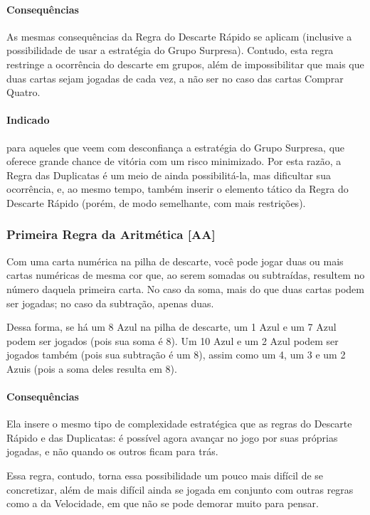 \paragraph{Consequências}

As mesmas consequências da Regra do Descarte Rápido se aplicam (inclusive a possibilidade de usar a estratégia do Grupo Surpresa). Contudo, esta regra restringe a ocorrência do descarte em grupos, além de impossibilitar que mais que duas cartas sejam jogadas de cada vez, a não ser no caso das cartas Comprar Quatro.

\paragraph{Indicado} 

para aqueles que veem com desconfiança a estratégia do Grupo Surpresa, que oferece grande chance de vitória com um risco minimizado. Por esta razão, a Regra das Duplicatas é um meio de ainda possibilitá-la, mas dificultar sua ocorrência, e, ao mesmo tempo, também inserir o elemento tático da Regra do Descarte Rápido (porém, de modo semelhante, com mais restrições).

\subsubsection{Primeira Regra da Aritmética [AA]}

Com uma carta numérica na pilha de descarte, você pode jogar duas ou mais cartas numéricas de mesma cor que, ao serem somadas ou subtraídas, resultem no número daquela primeira carta. No caso da soma, mais do que duas cartas podem ser jogadas; no caso da subtração, apenas duas.

Dessa forma, se há um 8 Azul na pilha de descarte, um 1 Azul e um 7 Azul podem ser jogados (pois sua soma é 8). Um 10 Azul e um 2 Azul podem ser jogados também (pois sua subtração é um 8), assim como um 4, um 3 e um 2 Azuis (pois a soma deles resulta em 8).

\paragraph{Consequências}

Ela insere o mesmo tipo de complexidade estratégica que as regras do Descarte Rápido e das Duplicatas: é possível agora avançar no jogo por suas próprias jogadas, e não quando os outros ficam para trás.

Essa regra, contudo, torna essa possibilidade um pouco mais difícil de se concretizar, além de mais difícil ainda se jogada em conjunto com outras regras como a da Velocidade, em que não se pode demorar muito para pensar.

